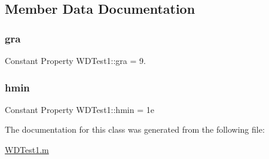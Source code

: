 \subsection{Member Data Documentation}
\mbox{\label{class_w_d_test1_a96428c6adab61537167ef1c857674b5c}} 
\subsubsection{\texorpdfstring{gra}{gra}}
{\footnotesize\ttfamily Constant Property W\+D\+Test1\+::gra = 9.}

\mbox{\label{class_w_d_test1_a82aa42df16be04a915c42b21e8a5233a}} 
\subsubsection{\texorpdfstring{hmin}{hmin}}
{\footnotesize\ttfamily Constant Property W\+D\+Test1\+::hmin = 1e}



The documentation for this class was generated from the following file\+:\begin{DoxyCompactItemize}
\item 
\hyperlink{_w_d_test1_8m}{W\+D\+Test1.\+m}\end{DoxyCompactItemize}
